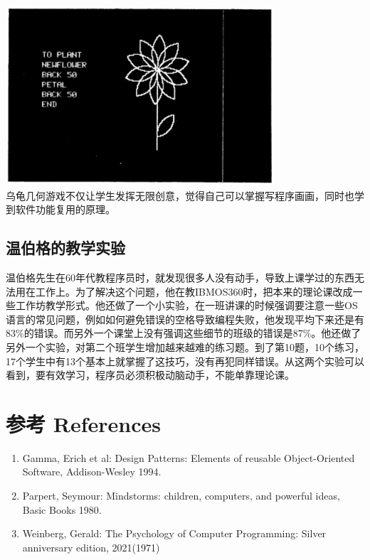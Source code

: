 \includegraphics[width=10cm]{mindstorm_p97.jpg}\\
乌龟几何游戏不仅让学生发挥无限创意，觉得自己可以掌握写程序画画，同时也学到软件功能复用的原理。

\hypertarget{ux6e29ux4f2fux683cux7684ux6559ux5b66ux5b9eux9a8c}{%
\subsection{温伯格的教学实验}\label{ux6e29ux4f2fux683cux7684ux6559ux5b66ux5b9eux9a8c}}

温伯格先生在60年代教程序员时，就发现很多人没有动手，导致上课学过的东西无法用在工作上。为了解决这个问题，他在教IBMOS360时，把本来的理论课改成一些工作坊教学形式。他还做了一个小实验，在一班讲课的时候强调要注意一些OS语言的常见问题，例如如何避免错误的空格导致编程失败，他发现平均下来还是有83\%的错误。而另外一个课堂上没有强调这些细节的班级的错误是87\%。他还做了另外一个实验，对第二个班学生增加越来越难的练习题。到了第10题，10个练习，17个学生中有13个基本上就掌握了这技巧，没有再犯同样错误。从这两个实验可以看到，要有效学习，程序员必须积极动脑动手，不能单靠理论课。


\hypertarget{ux9644ux4ef6}{%
\section{参考 References}\label{ux9644ux4ef6}}

\begin{enumerate}
\tightlist
\item
  Gamma, Erich et al: Design Patterns: Elements of reusable
  Object-Oriented Software, Addison-Wesley 1994.\\
\item
  Parpert, Seymour: Mindstorms: children, computers, and powerful ideas,
  Basic Books 1980.\\
\item
  Weinberg, Gerald: The Psychology of Computer Programming: Silver
  anniversary edition, 2021(1971)\\
\end{enumerate}




